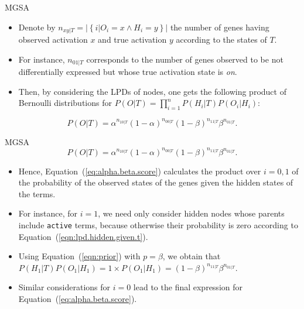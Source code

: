 \documentclass{beamer}
\newcommand{\numberofgenes}[3][|T]{n_{#2#3#1}}
\begin{document}
\begin{frame}{MGSA}

\begin{itemize}
 \item Denote by $\numberofgenes{x}{y} = |\left\{ i|O_{i}=x \wedge
  H_{i}=y\right\} |$ the number of genes having observed activation
$x$ and true activation $y$ according to the states of $T$. 
\item For
instance, $\numberofgenes{0}{1}$ corresponds to the number of genes
observed to be not differentially expressed but whose true activation
state is \textit{on}. 
\item Then, by considering the LPDs of nodes, one gets
the following product of Bernoulli distributions for $P(O|T)=
\prod_{i=1}^n P(H_i|T) P(O_i|H_i)$:
\end{itemize}

  


\begin{equation}
P(O|T) = \alpha^{\numberofgenes{1}{0}} (1 - \alpha)^{\numberofgenes{0}{0}}
(1-\beta)^{\numberofgenes{1}{1}} \beta^{\numberofgenes{0}{1}}.
\label{eq:alpha.beta.score}
\end{equation}
\end{frame}


 \begin{frame}{MGSA}
  \begin{equation}
P(O|T) = \alpha^{\numberofgenes{1}{0}} (1 - \alpha)^{\numberofgenes{0}{0}}
(1-\beta)^{\numberofgenes{1}{1}} \beta^{\numberofgenes{0}{1}}.
\label{eq:alpha.beta.score}
\end{equation}
\begin{itemize}
 \item Hence, Equation~(\ref{eq:alpha.beta.score}) calculates the product
over $i=0,1$ of the probability of the observed states of the genes
given the hidden states of the terms. 
\item For instance, for $i=1$, we need
only consider hidden nodes whose parents include \texttt{active}
terms, because otherwise their probability is zero according to
Equation~(\ref{eqn:lpd.hidden.given.t}).
\item Using Equation~(\ref{eqn:prior})
with $p=\beta$, we obtain that $P(H_1|T) P(O_1|H_1)=1\times P(O_1|H_1) =
(1-\beta)^{\numberofgenes{1}{1}}
\beta^{\numberofgenes{0}{1}}$. 
\item Similar considerations for $i=0$ lead
to the final expression for Equation~(\ref{eq:alpha.beta.score}).
\end{itemize}

 \end{frame}
\end{document}
